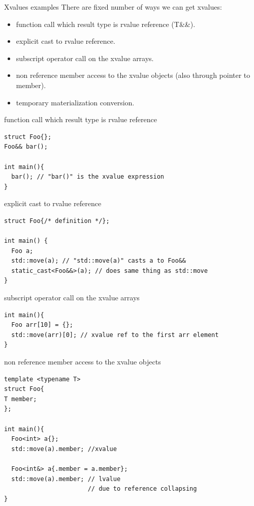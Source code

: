 \documentclass[10pt]{beamer}
\begin{document}
\begin{frame}{Xvalues examples}
	There are fixed number of ways we can get xvalues:
	\begin{itemize}
		\item function call which result type is rvalue reference (T\&\&).
		\item explicit cast to rvalue reference.
		\item subscript operator call on the xvalue arrays.
		\item non reference member access to the xvalue objects (also through pointer to member).
		\item temporary materialization conversion.
	\end{itemize}
\end{frame}

\begin{frame}[fragile]{function call which result type is rvalue reference}
	\begin{verbatim}
struct Foo{};
Foo&& bar(); 

int main(){
  bar(); // "bar()" is the xvalue expression 
}
	\end{verbatim}
\end{frame}

\begin{frame}[fragile]{explicit cast to rvalue reference}

\begin{verbatim}
struct Foo{/* definition */};

int main() {
  Foo a;
  std::move(a); // "std::move(a)" casts a to Foo&&
  static_cast<Foo&&>(a); // does same thing as std::move
}
\end{verbatim}

\end{frame}

\begin{frame}[fragile]{subscript operator call on the xvalue arrays}
	\begin{verbatim}
int main(){
  Foo arr[10] = {};
  std::move(arr)[0]; // xvalue ref to the first arr element
}
	\end{verbatim}
\end{frame}

\begin{frame}[fragile]{non reference member access  to the xvalue objects}
	\begin{verbatim}
template <typename T>
struct Foo{
T member;
};

int main(){
  Foo<int> a{};
  std::move(a).member; //xvalue 
  
  Foo<int&> a{.member = a.member};
  std::move(a).member; // lvalue 
                       // due to reference collapsing
}
	\end{verbatim}
\end{frame}
\end{document}
